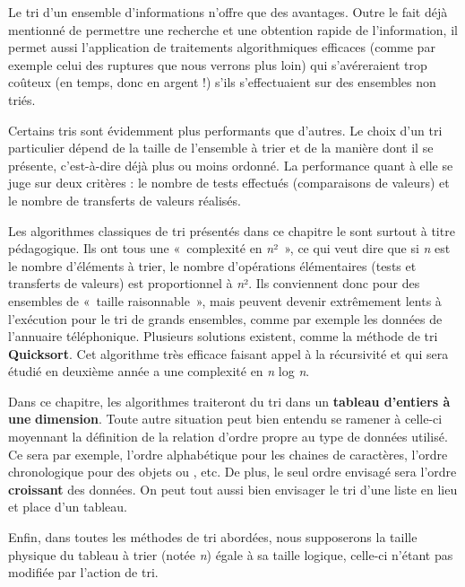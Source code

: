 	Le tri d’un ensemble d’informations n’offre que des avantages. Outre le
	fait déjà mentionné de permettre une recherche et une obtention rapide
	de l’information, il permet aussi l’application de traitements
	algorithmiques efficaces (comme par exemple celui des ruptures que nous
	verrons plus loin) qui s’avéreraient trop coûteux (en temps, donc en
	argent !) s’ils s’effectuaient sur des ensembles non triés.

	Certains tris sont évidemment plus performants que d’autres. Le choix
	d’un tri particulier dépend de la taille de l’ensemble à trier et de la
	manière dont il se présente, c’est-à-dire déjà plus ou moins ordonné.
	La performance quant à elle se juge sur deux critères : le nombre de
	tests effectués (comparaisons de valeurs) et le nombre de transferts de
	valeurs réalisés. 
	
	Les algorithmes classiques de tri présentés dans ce chapitre le sont
	surtout à titre pédagogique. Ils ont tous une «~complexité en
	\textit{n}²~», ce qui veut dire que si \textit{n} est le nombre
	d’éléments à trier, le nombre d’opérations élémentaires (tests et
	transferts de valeurs) est proportionnel à \textit{n}². Ils conviennent
	donc pour des ensembles de «~taille raisonnable~», mais peuvent devenir
	extrêmement lents à l’exécution pour le tri de grands ensembles, comme
	par exemple les données de l’annuaire téléphonique. Plusieurs solutions
	existent, comme la méthode de tri \textbf{Quicksort}. Cet algorithme
	très efficace faisant appel à la récursivité et qui sera étudié en
	deuxième année a une complexité en \textit{n} log \textit{n}. 

	Dans ce chapitre, les algorithmes traiteront du tri dans un
	\textbf{tableau d’entiers à une }\textbf{dimension}. Toute autre
	situation peut bien entendu se ramener à celle-ci moyennant la
	définition de la relation d’ordre propre au type de données utilisé. Ce
	sera par exemple, l’ordre alphabétique pour les chaines de caractères,
	l’ordre chronologique pour des objets  ou
	, etc. De plus, le seul ordre envisagé sera l’ordre
	\textbf{croissant} des données. On peut tout aussi bien envisager le
	tri d’une liste en lieu et place d’un tableau.

	Enfin, dans toutes les méthodes de tri abordées, nous supposerons la
	taille physique du tableau à trier (notée \textit{n}) égale à sa taille
	logique, celle-ci n’étant pas modifiée par l’action de tri.


